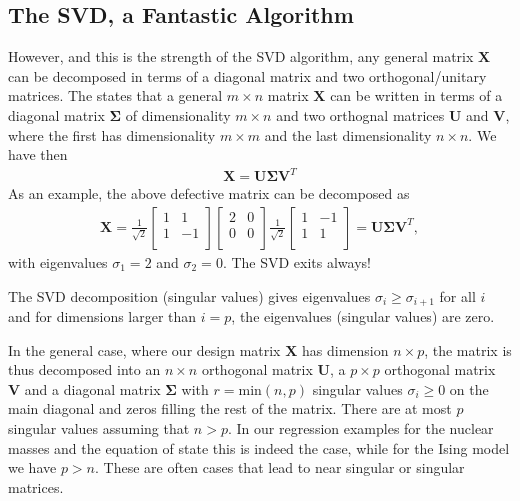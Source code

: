 \documentclass[letterpaper,10pt,english]{sphinxmanual}
\begin{document}
\subsection{The SVD, a Fantastic Algorithm}
\label{\detokenize{chapter4:the-svd-a-fantastic-algorithm}}
However, and this is the strength of the SVD algorithm, any general
matrix \(\boldsymbol{X}\) can be decomposed in terms of a diagonal matrix and
two orthogonal/unitary matrices.  The 
states that a general \(m\times n\) matrix \(\boldsymbol{X}\) can be written in
terms of a diagonal matrix \(\boldsymbol{\Sigma}\) of dimensionality \(m\times n\)
and two orthognal matrices \(\boldsymbol{U}\) and \(\boldsymbol{V}\), where the first has
dimensionality \(m \times m\) and the last dimensionality \(n\times n\).
We have then
\begin{equation*}
\begin{split}
\boldsymbol{X} = \boldsymbol{U}\boldsymbol{\Sigma}\boldsymbol{V}^T
\end{split}
\end{equation*}
As an example, the above defective matrix can be decomposed as
\begin{equation*}
\begin{split}
\boldsymbol{X} = \frac{1}{\sqrt{2}}\begin{bmatrix}  1&  1 \\ 1& -1\\ \end{bmatrix} \begin{bmatrix}  2&  0 \\ 0& 0\\ \end{bmatrix}    \frac{1}{\sqrt{2}}\begin{bmatrix}  1&  -1 \\ 1& 1\\ \end{bmatrix}=\boldsymbol{U}\boldsymbol{\Sigma}\boldsymbol{V}^T,
\end{split}
\end{equation*}
with eigenvalues \(\sigma_1=2\) and \(\sigma_2=0\).
The SVD exits always!

The SVD
decomposition (singular values) gives eigenvalues
\(\sigma_i\geq\sigma_{i+1}\) for all \(i\) and for dimensions larger than \(i=p\), the
eigenvalues (singular values) are zero.

In the general case, where our design matrix \(\boldsymbol{X}\) has dimension
\(n\times p\), the matrix is thus decomposed into an \(n\times n\)
orthogonal matrix \(\boldsymbol{U}\), a \(p\times p\) orthogonal matrix \(\boldsymbol{V}\)
and a diagonal matrix \(\boldsymbol{\Sigma}\) with \(r=\mathrm{min}(n,p)\)
singular values \(\sigma_i\geq 0\) on the main diagonal and zeros filling
the rest of the matrix.  There are at most \(p\) singular values
assuming that \(n > p\). In our regression examples for the nuclear
masses and the equation of state this is indeed the case, while for
the Ising model we have \(p > n\). These are often cases that lead to
near singular or singular matrices.
\end{document}
